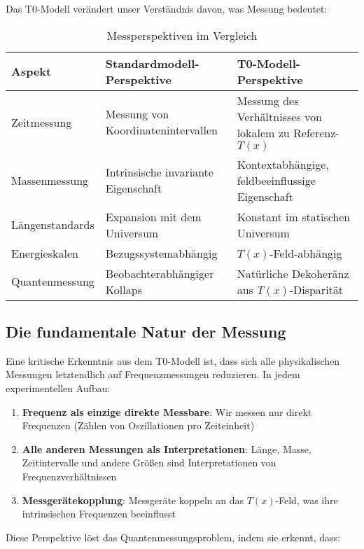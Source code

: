 \documentclass[12pt,a4paper]{article}
\newcommand{\Tfield}{T(x)}
\begin{document}
	Das T0-Modell verändert unser Verständnis davon, was Messung bedeutet:
	
	\begin{table}[h]
		\centering
		\begin{tabular}{>{\RaggedRight}p{} >{\RaggedRight}p{} >{\RaggedRight}p{}}
			\toprule
			\textbf{Aspekt} & \textbf{Standardmodell-Perspektive} & \textbf{T0-Modell-Perspektive} \\
			\midrule
			Zeitmessung & Messung von Koordinatenintervallen & Messung des Verhältnisses von lokalem zu Referenz-$\Tfield$ \\
			Massenmessung & Intrinsische invariante Eigenschaft & Kontextabhängige, feldbeeinflussige Eigenschaft \\
			Längenstandards & Expansion mit dem Universum & Konstant im statischen Universum \\
			Energieskalen & Bezugssystemabhängig & $\Tfield$-Feld-abhängig \\
			Quantenmessung & Beobachterabhängiger Kollaps & Natürliche Dekoheränz aus $\Tfield$-Disparität \\
			\bottomrule
		\end{tabular}
		\caption{Messperspektiven im Vergleich}
	\end{table}
	
	\subsection{Die fundamentale Natur der Messung}
	
	Eine kritische Erkenntnis aus dem T0-Modell ist, dass sich alle physikalischen Messungen letztendlich auf Frequenzmessungen reduzieren. In jedem experimentellen Aufbau:
	
	\begin{enumerate}
		\item \textbf{Frequenz als einzige direkte Messbare}: Wir messen nur direkt Frequenzen (Zählen von Oszillationen pro Zeiteinheit)
		\item \textbf{Alle anderen Messungen als Interpretationen}: Länge, Masse, Zeitintervalle und andere Größen sind Interpretationen von Frequenzverhältnissen
		\item \textbf{Messgerätekopplung}: Messgeräte koppeln an das $\Tfield$-Feld, was ihre intrinsischen Frequenzen beeinflusst
	\end{enumerate}
	
	Diese Perspektive löst das Quantenmessungsproblem, indem sie erkennt, dass:
	
\end{document}
